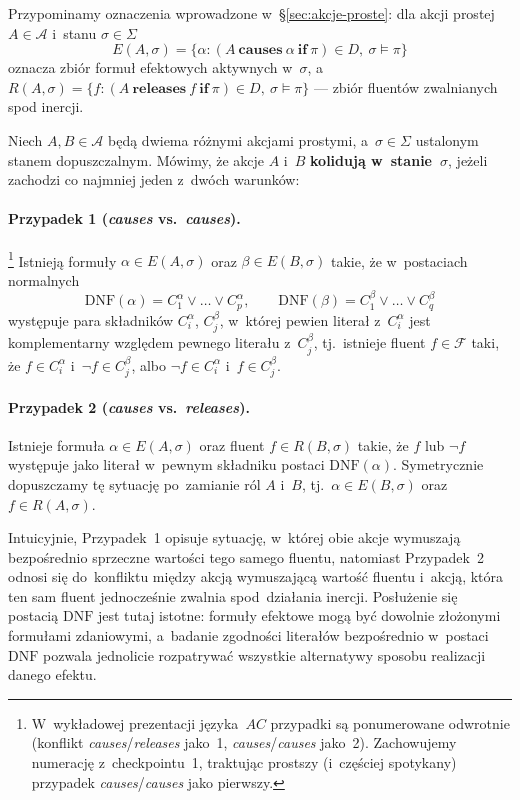 \documentclass[11pt,a4paper]{article}
\newif\ifshowbib
\newcommand{\bibonly}[1]{\ifshowbib#1\fi}
\renewcommand{\cite}[2][]{\unskip}%
\newcommand{\causes}{\textbf{causes}}
\renewcommand{\iff}{\textbf{if}}
\newcommand{\releases}{\textbf{releases}}
\newcommand{\DNF}{\mathrm{DNF}}
\theoremstyle{definition}
\begin{document}
Przypominamy oznaczenia wprowadzone w~§\ref{sec:akcje-proste}: dla akcji prostej $A \in \mathcal{A}$ i~stanu $\sigma \in \Sigma$
\[
  E(A,\sigma)=\{\alpha : (A\ \causes\ \alpha\ \iff\ \pi)\in D,\ \sigma \models \pi\}
\]
oznacza zbiór formuł efektowych aktywnych w~$\sigma$, a~$R(A,\sigma)=\{f : (A\ \releases\ f\ \iff\ \pi)\in D,\ \sigma \models \pi\}$ --- zbiór fluentów zwalnianych spod inercji.

\noindent Niech $A, B \in \mathcal{A}$ będą dwiema różnymi akcjami prostymi, a~$\sigma \in \Sigma$
ustalonym stanem dopuszczalnym. Mówimy, że akcje $A$ i~$B$
\textbf{kolidują w~stanie~$\sigma$}, jeżeli zachodzi co najmniej jeden
z~dwóch warunków:

\paragraph{Przypadek 1 (\textit{causes} vs.\ \textit{causes}).}\footnote{W~wykładowej prezentacji języka~$AC$\bibonly{~\cite{rw05}} przypadki są ponumerowane odwrotnie (konflikt \textit{causes}/\textit{releases} jako~1, \textit{causes}/\textit{causes} jako~2). Zachowujemy numerację z~checkpointu~1, traktując prostszy (i~częściej spotykany) przypadek \textit{causes}/\textit{causes} jako pierwszy.}
Istnieją formuły $\alpha \in E(A,\sigma)$ oraz $\beta \in E(B,\sigma)$
takie, że w~postaciach normalnych
\[
  \DNF(\alpha) = C_1^\alpha \lor \ldots \lor C_{p}^\alpha,
  \qquad
  \DNF(\beta) = C_1^\beta \lor \ldots \lor C_{q}^\beta
\]
występuje para składników $C_i^\alpha$, $C_j^\beta$, w~której pewien
literał z~$C_i^\alpha$ jest komplementarny względem pewnego literału
z~$C_j^\beta$, tj.\ istnieje fluent $f \in \mathcal{F}$ taki, że
$f \in C_i^\alpha$ i~$\neg f \in C_j^\beta$, albo $\neg f \in C_i^\alpha$
i~$f \in C_j^\beta$.

\paragraph{Przypadek 2 (\textit{causes} vs.\ \textit{releases}).}
Istnieje formuła $\alpha \in E(A,\sigma)$ oraz fluent $f \in R(B,\sigma)$
takie, że $f$ lub $\neg f$ występuje jako literał w~pewnym składniku
postaci $\DNF(\alpha)$. Symetrycznie dopuszczamy tę sytuację po~zamianie
ról $A$ i~$B$, tj.\ $\alpha \in E(B,\sigma)$ oraz $f \in R(A,\sigma)$.

\medskip
Intuicyjnie, Przypadek~1 opisuje sytuację, w~której obie akcje wymuszają
bezpośrednio sprzeczne wartości tego samego fluentu, natomiast Przypadek~2
odnosi się do~konfliktu między akcją wymuszającą wartość fluentu i~akcją,
która ten sam fluent jednocześnie zwalnia spod~działania inercji.
Posłużenie się postacią $\DNF$ jest tutaj istotne: formuły efektowe mogą
być dowolnie złożonymi formułami zdaniowymi, a~badanie zgodności literałów
bezpośrednio w~postaci $\DNF$ pozwala jednolicie rozpatrywać wszystkie
alternatywy sposobu realizacji danego efektu.
\end{document}
